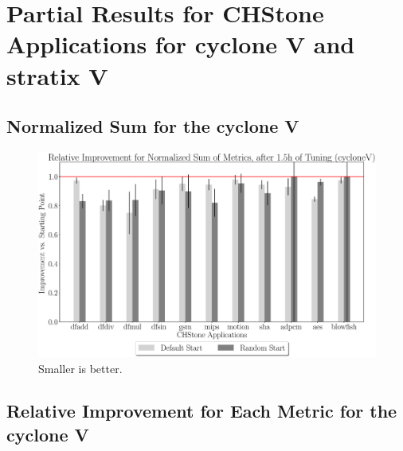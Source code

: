 \documentclass[12pt, a4paper]{article}
\begin{document}
\section{Partial Results for CHStone Applications for cyclone V and stratix V}

\subsection{Normalized Sum for the cyclone V}

\begin{figure}[htpb]
    \centering
    \includegraphics[width=.4\textwidth]{rel_comp_nsam_5400_chstone_cycloneV}
    \caption{Smaller is better.}
\end{figure}

\subsection{Relative Improvement for Each Metric for the cyclone V}
\end{document}
